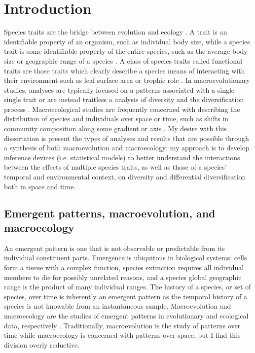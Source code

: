 \chapter{Introduction}


Species traits are the bridge between evolution and ecology \citep{Mcgill2006,Webber2017}. A trait is an identifiable property of an organism, such as individual body size, while a species trait is some identifiable property of the entire species, such as the average body size or geographic range of a species \citep{Mcgill2006}. A class of species traits called functional traits are those traits which clearly describe a species means of interacting with their environment such as leaf surface area or trophic role \citep{Mcgill2006}. In macroevolutionary studies, analyses are typically focused on a patterns associated with a single single trait or are instead traitless a analysis of diversity and the diversification process \citep{Silvestro2014a,Silvestro2015b,Pires2015a,Rabosky2013,Slater2015c,Hunt2007a,Hunt2006a,Liow2008,Payne2007}. Macroecological studies are frequently concerned with describing the distribution of species and individuals over space or time, such as shifts in community composition along some gradient or axis \citep{Smith2008b,Smith2004,Brown1995,Brown1989,Bush2007,Eronen2009,Fortelius2002,Jernvall2002,Jernvall2004}. My desire with this dissertation is present the types of analyses and results that are possible through a synthesis of both macroevolution and macroecology; my approach is to develop inference devices (i.e. statistical models) to better understand the interactions between the effects of multiple species traits, as well as those of a species' temporal and environmental context, on diversity and differential diversification both in space and time.


\section{Emergent patterns, macroevolution, and macroecology}

An emergent pattern is one that is not observable or predictable from its individual constituent parts. Emergence is ubiquitous in biological systems: cells form a tissue with a complex function, species extinction requires all individual members to die for possibly unrelated reasons, and a species global geographic range is the product of many individual ranges. The history of a species, or set of species, over time is inherently an emergent pattern as the temporal history of a species is not knowable from an instantaneous sample. Macroevolution and macroecology are the studies of emergent patterns in evolutionary and ecological data, respectively \citep{Brown1989,Brown1995,Stanley1979,Stanley1975}. Traditionally, macroevolution is the study of patterns over time while macroecology is concerned with patterns over space, but I find this division overly reductive.

